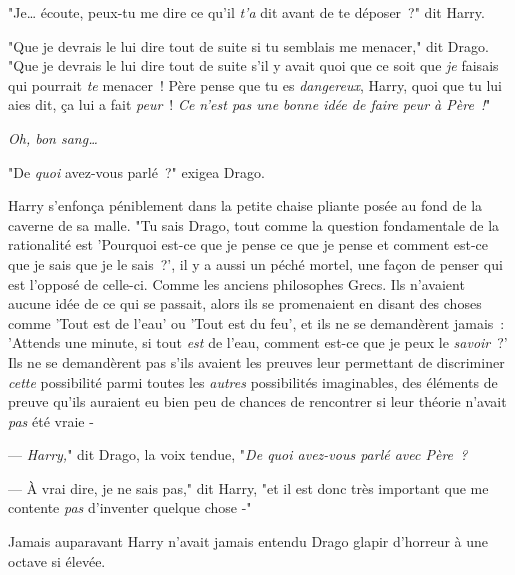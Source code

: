 "Je… écoute, peux-tu me dire ce qu'il \emph{t'a} dit avant de te déposer~?" dit Harry.

"Que je devrais le lui dire tout de suite si tu semblais me menacer," dit Drago. "Que je devrais le lui dire tout de suite s'il y avait quoi que ce soit que \emph{je} faisais qui pourrait \emph{te} menacer~! Père pense que tu es \emph{dangereux}, Harry, quoi que tu lui aies dit, ça lui a fait \emph{peur}~! \emph{Ce n'est pas une bonne idée de faire peur à Père~!}"

\emph{Oh, bon sang…}

"De \emph{quoi} avez-vous parlé~?" exigea Drago.

Harry s'enfonça péniblement dans la petite chaise pliante posée au fond de la caverne de sa malle. "Tu sais Drago, tout comme la question fondamentale de la rationalité est 'Pourquoi est-ce que je pense ce que je pense et comment est-ce que je sais que je le sais~?', il y a aussi un péché mortel, une façon de penser qui est l'opposé de celle-ci. Comme les anciens philosophes Grecs. Ils n'avaient aucune idée de ce qui se passait, alors ils se promenaient en disant des choses comme 'Tout est de l'eau' ou 'Tout est du feu', et ils ne se demandèrent jamais~: 'Attends une minute, si tout \emph{est} de l'eau, comment est-ce que je peux le \emph{savoir}~?' Ils ne se demandèrent pas s'ils avaient les preuves leur permettant de discriminer \emph{cette} possibilité parmi toutes les \emph{autres} possibilités imaginables, des éléments de preuve qu'ils auraient eu bien peu de chances de rencontrer si leur théorie n'avait \emph{pas} été vraie -

--- \emph{Harry,}" dit Drago, la voix tendue, "\emph{De quoi avez-vous parlé avec Père~?}

--- À vrai dire, je ne sais pas," dit Harry, "et il est donc très important que me contente \emph{pas} d'inventer quelque chose -"

Jamais auparavant Harry n'avait jamais entendu Drago glapir d'horreur à une octave si élevée. 


